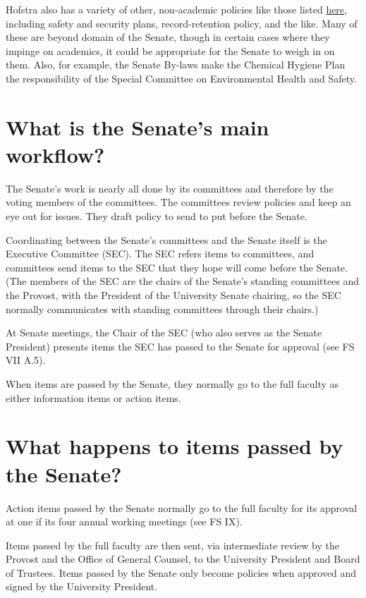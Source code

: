 \documentclass[12pt]{article}
\begin{document}
Hofstra also has a variety of other, non-academic policies like those
listed \href{https://www.hofstra.edu/about/policies.html}{here},
including safety and security plans, record-retention policy, and the
like. Many of these are beyond domain of the Senate, though in certain
cases where they impinge on academics, it could be appropriate for the
Senate to weigh in on them. Also, for example, the Senate By-laws make
the Chemical Hygiene Plan the responsibility of the Special Committee on
Environmental Health and Safety.

\section{What is the Senate's main
workflow?}\label{what-is-the-senates-main-workflow}

The Senate's work is nearly all done by its committees and therefore by
the voting members of the committees. The committees review policies and
keep an eye out for issues. They draft policy to send to put before the
Senate.

Coordinating between the Senate's committees and the Senate itself is
the Executive Committee (SEC). The SEC refers items to committees, and
committees send items to the SEC that they hope will come before the
Senate. (The members of the SEC are the chairs of the Senate's standing
committees and the Provost, with the President of the University Senate
chairing, so the SEC normally communicates with standing committees
through their chairs.)

At Senate meetings, the Chair of the SEC (who also serves as the Senate
President) presents items the SEC has passed to the Senate for approval
(see FS VII A.5).

When items are passed by the Senate, they normally go to the full
faculty as either information items or action items.

\section{What happens to items passed by the
Senate?}\label{what-happens-to-items-passed-by-the-senate}

Action items passed by the Senate normally go to the full faculty for
its approval at one if its four annual working meetings (see FS IX).

Items passed by the full faculty are then sent, via intermediate review
by the Provost and the Office of General Counsel, to the University
President and Board of Trustees. Items passed by the Senate only become
policies when approved and signed by the University President.
\end{document}

